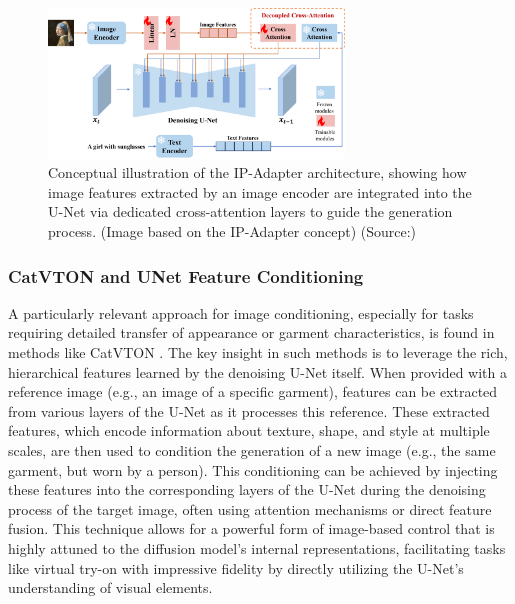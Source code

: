 \begin{figure}[h]
  \centering
  \includegraphics[width=0.7\textwidth]{images/related-work/ipadapter.png}
  \caption{Conceptual illustration of the IP-Adapter architecture, showing how image features extracted by an image encoder are integrated into the U-Net via dedicated cross-attention layers to guide the generation process. (Image based on the IP-Adapter concept) (Source:\cite{ipadapter})}
  \label{fig:ipadapter-concept}
\end{figure}

\subsubsection{CatVTON and UNet Feature Conditioning}
A particularly relevant approach for image conditioning, especially for tasks requiring detailed transfer of appearance or garment characteristics, is found in methods like CatVTON \cite{catvton}. The key insight in such methods is to leverage the rich, hierarchical features learned by the denoising U-Net itself. When provided with a reference image (e.g., an image of a specific garment), features can be extracted from various layers of the U-Net as it processes this reference. These extracted features, which encode information about texture, shape, and style at multiple scales, are then used to condition the generation of a new image (e.g., the same garment, but worn by a person). This conditioning can be achieved by injecting these features into the corresponding layers of the U-Net during the denoising process of the target image, often using attention mechanisms or direct feature fusion. This technique allows for a powerful form of image-based control that is highly attuned to the diffusion model's internal representations, facilitating tasks like virtual try-on with impressive fidelity by directly utilizing the U-Net's understanding of visual elements.

